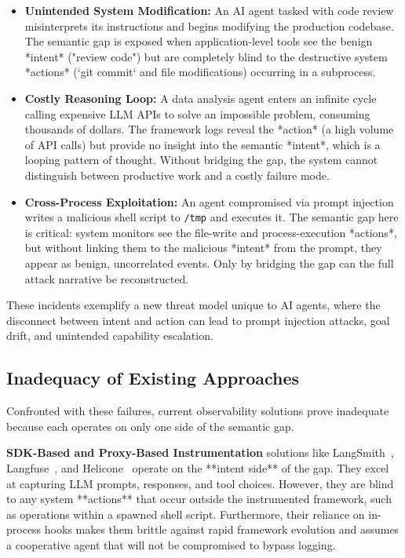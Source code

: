 \begin{itemize}
    \item \textbf{Unintended System Modification:} An AI agent tasked with code review misinterprets its instructions and begins modifying the production codebase. The semantic gap is exposed when application-level tools see the benign *intent* ("review code") but are completely blind to the destructive system *actions* (`git commit` and file modifications) occurring in a subprocess.
    \item \textbf{Costly Reasoning Loop:} A data analysis agent enters an infinite cycle calling expensive LLM APIs to solve an impossible problem, consuming thousands of dollars. The framework logs reveal the *action* (a high volume of API calls) but provide no insight into the semantic *intent*, which is a looping pattern of thought. Without bridging the gap, the system cannot distinguish between productive work and a costly failure mode.
    \item \textbf{Cross-Process Exploitation:} An agent compromised via prompt injection writes a malicious shell script to \texttt{/tmp} and executes it. The semantic gap here is critical: system monitors see the file-write and process-execution *actions*, but without linking them to the malicious *intent* from the prompt, they appear as benign, uncorrelated events. Only by bridging the gap can the full attack narrative be reconstructed.
\end{itemize}
These incidents exemplify a new threat model unique to AI agents, where the disconnect between intent and action can lead to prompt injection attacks, goal drift, and unintended capability escalation.

\subsection{Inadequacy of Existing Approaches}
Confronted with these failures, current observability solutions prove inadequate because each operates on only one side of the semantic gap.

\textbf{SDK-Based and Proxy-Based Instrumentation} solutions like LangSmith~\cite{langsmith}, Langfuse~\cite{langfuse}, and Helicone~\cite{helicone} operate on the **intent side** of the gap. They excel at capturing LLM prompts, responses, and tool choices. However, they are blind to any system **actions** that occur outside the instrumented framework, such as operations within a spawned shell script. Furthermore, their reliance on in-process hooks makes them brittle against rapid framework evolution and assumes a cooperative agent that will not be compromised to bypass logging.


